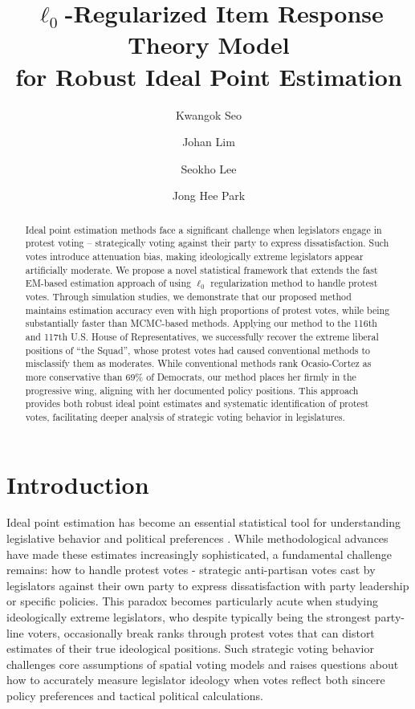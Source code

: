 \documentclass[11pt]{article}
\title{$\ell_0$-Regularized Item Response Theory Model\\ for Robust Ideal Point Estimation}
\author[1]{Kwangok Seo}
\author[1]{Johan Lim}
\author[2]{Seokho Lee}
\author[3]{Jong Hee Park}
\affil[1]{Department of Statistics, Seoul National University, Seoul, Korea}
\affil[2]{Department of Statistics, Hankuk University of Foreign Studies, Yongin, Korea}
\affil[3]{Department of Political Science and International Relations, Seoul National University, Seoul, Korea}
\date{}
\begin{document}
\maketitle 

\begin{abstract}
    Ideal point estimation methods face a significant challenge when legislators engage in protest voting -- strategically voting against their party to express dissatisfaction. Such votes introduce attenuation bias, making ideologically extreme legislators appear artificially moderate. We propose a novel statistical framework that extends the fast EM-based estimation approach of \cite{Imai2016} using $\ell_0$ regularization method to handle protest votes. Through simulation studies, we demonstrate that our proposed method maintains estimation accuracy even with high proportions of protest votes, while being substantially faster than MCMC-based methods. Applying our method to the 116th and 117th U.S. House of Representatives, we successfully recover the extreme liberal positions of ``the Squad'', whose protest votes had caused conventional methods to misclassify them as moderates. While conventional methods rank Ocasio-Cortez as more conservative than 69\% of Democrats, our method places her firmly in the progressive wing, aligning with her documented policy positions. This approach provides both robust ideal point estimates and systematic identification of protest votes, facilitating deeper analysis of strategic voting behavior in legislatures.

\end{abstract}

\baselineskip 18pt 

\section{Introduction}
Ideal point estimation has become an essential statistical tool for understanding legislative behavior and political preferences \citep{Poole1997, Bailey2001, Martin2002, Clinton2004, Spirling2010, Peress2010, Royce2013, Imai2016, Goplerud2019, Moser2021, Binding2022}. While methodological advances have made these estimates increasingly sophisticated, a fundamental challenge remains: how to handle protest votes - strategic anti-partisan votes cast by legislators against their own party to express dissatisfaction with party leadership or specific policies. This paradox becomes particularly acute when studying ideologically extreme legislators, who despite typically being the strongest party-line voters, occasionally break ranks through protest votes that can distort estimates of their true ideological positions. Such strategic voting behavior challenges core assumptions of spatial voting models and raises questions about how to accurately measure legislator ideology when votes reflect both sincere policy preferences and tactical political calculations.
\end{document}

